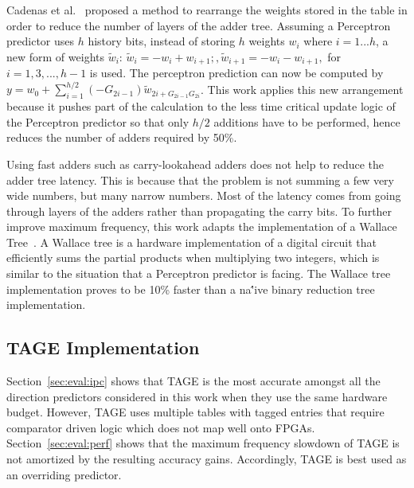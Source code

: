 \documentclass[conference]{IEEEtran}
\begin{document}
Cadenas et al.~\cite{perceptronRearrange} proposed a method to rearrange the weights stored in the table in order to reduce the number of layers of the adder tree. Assuming a Perceptron predictor uses $h$ history bits, instead of storing $h$ weights $w_i$ where $i = 1 ... h$, a new form of weights $\widetilde{w}_i$: $\widetilde{w}_i = - w_i + w_{i+1};, \widetilde{w}_{i+1} = - w_i - w_{i+1},$ for $i = 1, 3, ..., h-1$ is used. The perceptron prediction can now be computed by $y = w_0 + \sum_{i=1}^{h/2}(-G_{2i-1})\widetilde{w}_{2i+G_{2i-1}G_{2i}}$. This work applies this new arrangement because it pushes part of the calculation to the less time critical update logic of the Perceptron predictor so that only $h/2$ additions have to be performed, hence reduces the number of adders required by 50\%.

Using fast adders such as carry-lookahead adders does not help to reduce the adder tree latency. This is because that the problem is not summing a few very wide numbers, but many narrow numbers. Most of the latency comes from going through layers of the adders rather than propagating the carry bits. To further improve maximum frequency, this work adapts the implementation of a Wallace Tree~\cite{wallacetree}. A Wallace tree is a hardware implementation of a digital circuit that efficiently sums the partial products when multiplying two integers, which is similar to the situation that a Perceptron predictor is facing. The Wallace tree implementation proves to be 10\% faster than a na\''ive binary reduction tree implementation. 

\subsection{TAGE Implementation}
\label{sec:fpga:tage}
Section~\ref{sec:eval:ipc} shows that TAGE  is the most accurate amongst all the direction predictors considered in this work when they use the same hardware budget. However, TAGE uses multiple tables with tagged entries that require comparator driven logic which does not map well onto FPGAs. Section~\ref{sec:eval:perf} shows that the maximum frequency slowdown of TAGE is not amortized by the resulting accuracy gains. Accordingly, TAGE is best used as an overriding predictor.
\end{document}
